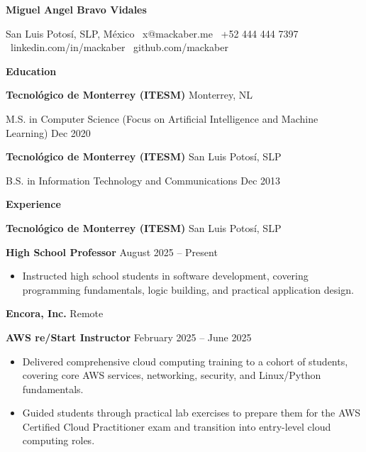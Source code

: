 \documentclass[11pt]{article}
\begin{document}
\begin{center}
    \textbf{\LARGE Miguel Angel Bravo Vidales}\\ 
    \vspace{4pt}
    \hrulefill
\end{center}

\begin{center}
    San Luis Potosí, SLP, México \textbullet \ x@mackaber.me \textbullet \ +52 444 444 7397 \textbullet \ linkedin.com/in/mackaber \textbullet \ github.com/mackaber
\end{center}

\vspace{0.5pt}

\begin{center}
    \textbf{Education}
\end{center}
\textbf{Tecnológico de Monterrey (ITESM)} \hfill Monterrey, NL

M.S. in Computer Science (Focus on Artificial Intelligence and Machine Learning) \hfill Dec 2020

\vspace{10pt}

\textbf{Tecnológico de Monterrey (ITESM)} \hfill	San Luis Potosí, SLP

B.S. in Information Technology and Communications \hfill Dec 2013

\vspace{12pt}

\begin{center}
    \textbf{Experience}
\end{center}

\textbf{Tecnológico de Monterrey (ITESM)} \hfill San Luis Potosí, SLP

\textbf{High School Professor} \hfill August 2025 – Present
\begin{itemize}[noitemsep, topsep=0pt, partopsep=0pt, parsep=0pt]
    \item Instructed high school students in software development, covering programming fundamentals, logic building, and practical application design.
\end{itemize}

\vspace{8pt}

\textbf{Encora, Inc.} \hfill Remote

\textbf{AWS re/Start Instructor} \hfill February 2025 – June 2025
\begin{itemize}[noitemsep, topsep=0pt, partopsep=0pt, parsep=0pt]
    \item Delivered comprehensive cloud computing training to a cohort of students, covering core AWS services, networking, security, and Linux/Python fundamentals.
    \item Guided students through practical lab exercises to prepare them for the AWS Certified Cloud Practitioner exam and transition into entry-level cloud computing roles.
\end{itemize}
\end{document}
